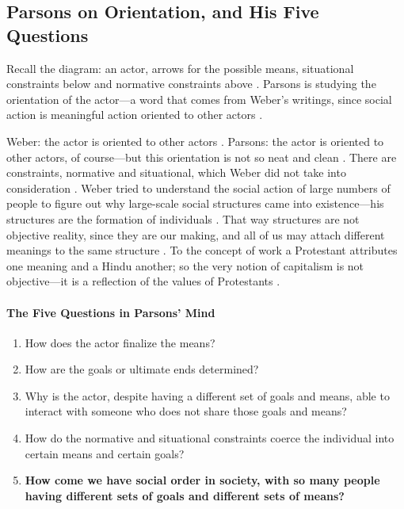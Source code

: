 \subsection{Parsons on Orientation, and His Five Questions}
Recall the diagram: an actor, arrows for the possible means, situational constraints below and normative constraints above . Parsons is studying the orientation of the actor---a word that comes from Weber's writings, since social action is meaningful action oriented to other actors .

\begin{ComparisonBox}
Weber: the actor is oriented to other actors .
Parsons: the actor is oriented to other actors, of course---but this orientation is not so neat and clean . There are constraints, normative and situational, which Weber did not take into consideration .
Weber tried to understand the social action of large numbers of people to figure out why large-scale social structures came into existence---his structures are the formation of individuals . That way structures are not objective reality, since they are our making, and all of us may attach different meanings to the same structure . To the concept of work a Protestant attributes one meaning and a Hindu another; so the very notion of capitalism is not objective---it is a reflection of the values of Protestants .
\end{ComparisonBox}

\paragraph{The Five Questions in Parsons' Mind}
\begin{enumerate}
    \item How does the actor finalize the means? 
    \item How are the goals or ultimate ends determined? 
    \item Why is the actor, despite having a different set of goals and means, able to interact with someone who does not share those goals and means? 
    \item How do the normative and situational constraints coerce the individual into certain means and certain goals? 
    \item \textbf{How come we have social order in society, with so many people having different sets of goals and different sets of means?} 
\end{enumerate}

